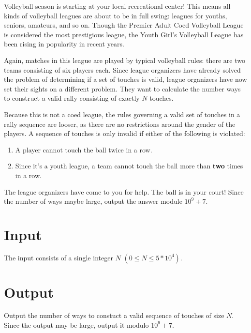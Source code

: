 
Volleyball season is starting at your local recreational center! This means all kinds of volleyball
leagues are about to be in full swing: leagues for youths, seniors, amateurs, and so on. Though the
Premier Adult Coed Volleyball League is considered the most prestigious league, the Youth Girl's
Volleyball League has been rising in popularity in recent years.

Again, matches in this league are played by typical volleyball rules: there are two teams consisting of six
players each. Since league organizers have already solved the problem of determining if a set of touches is
valid, league organizers have now set their sights on a different problem. They want to
calculate the number ways to construct a valid rally consisting of exactly $N$ touches.

Because this is not a coed league, the rules governing a valid set of touches in a rally sequence 
are looser, as there are no restrictions around the gender of the players. A sequence of touches is only
invalid if either of the following is violated:

\begin{enumerate}
    \item A player cannot touch the ball twice in a row.
    \item Since it's a youth league, a team cannot touch the ball more than \textbf{two} times in a row.
\end{enumerate}

The league organizers have come to you for help. The ball is in your court! Since the number of ways
maybe large, output the answer module $10^9 + 7$.

\section*{Input}

The input consists of a single integer $N$ $(0 \leq N \leq 5 * 10^4)$.

\section*{Output}

Output the number of ways to constuct a valid sequence of touches of size $N$. Since the output may be
large, output it modulo $10^9 + 7$.
